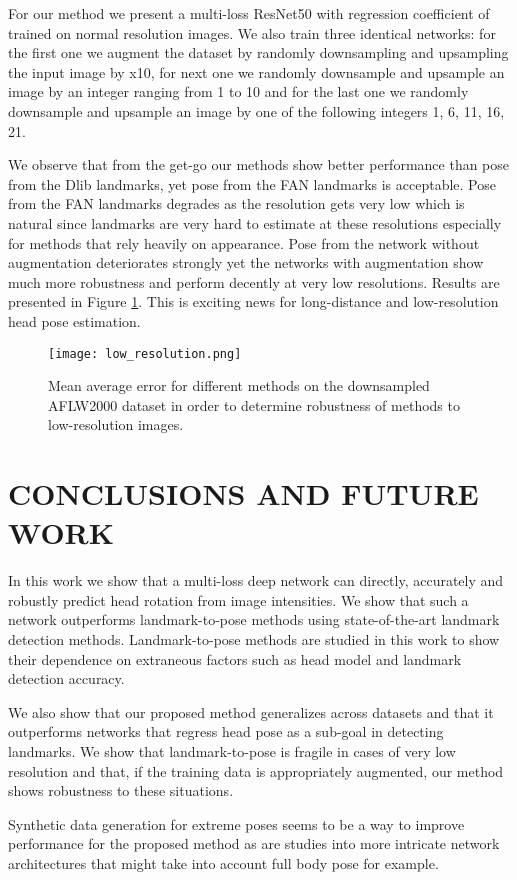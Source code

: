 \documentclass[10pt,twocolumn,letterpaper]{article}
\begin{document}
For our method we present a multi-loss ResNet50 with regression coefficient of  trained on normal resolution images. We also train three identical networks: for the first one we augment the dataset by randomly downsampling and upsampling the input image by x10, for next one we randomly downsample and upsample an image by an integer ranging from 1 to 10 and for the last one we randomly downsample and upsample an image by one of the following integers 1, 6, 11, 16, 21.

We observe that from the get-go our methods show better performance than pose from the Dlib landmarks, yet pose from the FAN landmarks is acceptable. Pose from the FAN landmarks degrades as the resolution gets very low which is natural since landmarks are very hard to estimate at these resolutions especially for methods that rely heavily on appearance. Pose from the network without augmentation deteriorates strongly yet the networks with augmentation show much more robustness and perform decently at very low resolutions. Results are presented in Figure \ref{low_resolution}. This is exciting news for long-distance and low-resolution head pose estimation.
\begin{figure}[t]
\begin{center}
   \texttt{[image: low\_resolution.png]}
\end{center}
   \caption{Mean average error for different methods on the downsampled AFLW2000 dataset in order to determine robustness of methods to low-resolution images.}
   \label{low_resolution}
\end{figure}

\addtolength{\textheight}{-3cm}   

\section{CONCLUSIONS AND FUTURE WORK}\label{sec5}
In this work we show that a multi-loss deep network can directly, accurately and robustly predict head rotation from image intensities. We show that such a network outperforms landmark-to-pose methods using state-of-the-art landmark detection methods. Landmark-to-pose methods are studied in this work to show their dependence on extraneous factors such as head model and landmark detection accuracy.

We also show that our proposed method generalizes across datasets and that it outperforms networks that regress head pose as a sub-goal in detecting landmarks. We show that landmark-to-pose is fragile in cases of very low resolution and that, if the training data is appropriately augmented, our method shows robustness to these situations.

Synthetic data generation for extreme poses seems to be a way to improve performance for the proposed method as are studies into more intricate network architectures that might take into account full body pose for example.





{\small


}
\end{document}
